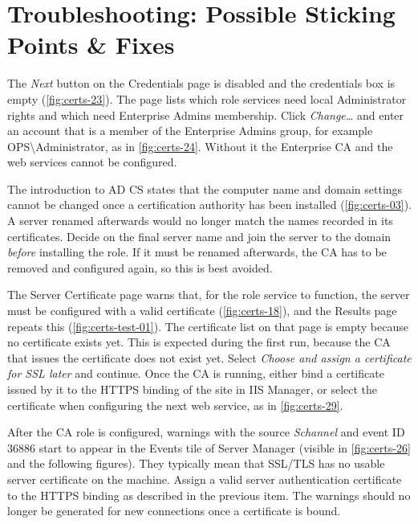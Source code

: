 
\section{Troubleshooting: Possible Sticking Points \& Fixes}
\label{sec:certs-troubleshooting}
{The \emph{Next} button on the Credentials page is disabled and the credentials box is empty (\autoref{fig:certs-23}). The page lists which role services need local Administrator rights and which need Enterprise Admins membership.}
{Click \emph{Change\ldots} and enter an account that is a member of the Enterprise Admins group, for example OPS\textbackslash Administrator, as in \autoref{fig:certs-24}. Without it the Enterprise CA and the web services cannot be configured.}

{The introduction to AD CS states that the computer name and domain settings cannot be changed once a certification authority has been installed (\autoref{fig:certs-03}). A server renamed afterwards would no longer match the names recorded in its certificates.}
{Decide on the final server name and join the server to the domain \emph{before} installing the role. If it must be renamed afterwards, the CA has to be removed and configured again, so this is best avoided.}

{The Server Certificate page warns that, for the role service to function, the server must be configured with a valid certificate (\autoref{fig:certs-18}), and the Results page repeats this (\autoref{fig:certs-test-01}). The certificate list on that page is empty because no certificate exists yet.}
{This is expected during the first run, because the CA that issues the certificate does not exist yet. Select \emph{Choose and assign a certificate for SSL later} and continue. Once the CA is running, either bind a certificate issued by it to the HTTPS binding of the site in IIS Manager, or select the certificate when configuring the next web service, as in \autoref{fig:certs-29}.}

{After the CA role is configured, warnings with the source \emph{Schannel} and event ID 36886 start to appear in the Events tile of Server Manager (visible in \autoref{fig:certs-26} and the following figures). They typically mean that SSL/TLS has no usable server certificate on the machine.}
{Assign a valid server authentication certificate to the HTTPS binding as described in the previous item. The warnings should no longer be generated for new connections once a certificate is bound.}

